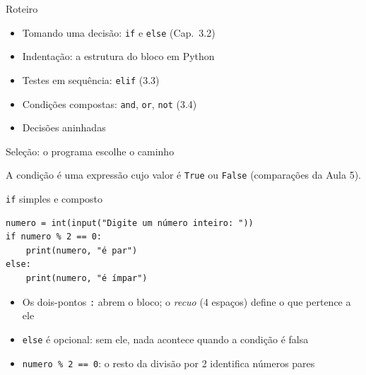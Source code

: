 \documentclass[aspectratio=169,10pt,t]{beamer}
\begin{document}
\capa

\begin{frame}{Roteiro}
  \begin{itemize}
    \item Tomando uma decisão: \texttt{if} e \texttt{else} (Cap.~3.2)
    \item Indentação: a estrutura do bloco em Python
    \item Testes em sequência: \texttt{elif} (3.3)
    \item Condições compostas: \texttt{and}, \texttt{or}, \texttt{not} (3.4)
    \item Decisões aninhadas
  \end{itemize}
\end{frame}

\begin{frame}{Seleção: o programa escolhe o caminho}
  \begin{center}
  \end{center}
  \vspace{-1ex}
  A condição é uma expressão cujo valor é \texttt{True} ou \texttt{False} (comparações da Aula 5).
\end{frame}

\begin{frame}[fragile]{\texttt{if} simples e composto}
\begin{lstlisting}
numero = int(input("Digite um número inteiro: "))
if numero % 2 == 0:
    print(numero, "é par")
else:
    print(numero, "é ímpar")
\end{lstlisting}
  \begin{itemize}
    \item Os dois-pontos \texttt{:} abrem o bloco; o \emph{recuo} (4 espaços) define o que pertence a ele
    \item \texttt{else} é opcional: sem ele, nada acontece quando a condição é falsa
    \item \texttt{numero \% 2 == 0}: o resto da divisão por 2 identifica números pares
  \end{itemize}
\end{frame}
\end{document}
